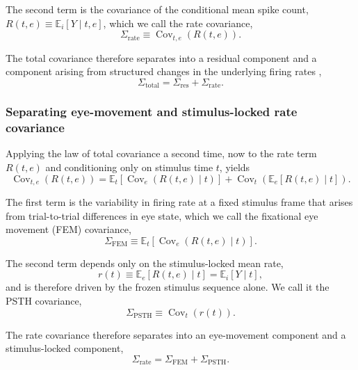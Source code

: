 \documentclass{lite}
\newcommand{\E}{\mathbb{E}}
\renewcommand{\C}{\operatorname{Cov}}
\newcommand{\Crate}{\Sigma_{\text{rate}}}
\begin{document}
The second term is the covariance of the conditional mean spike count, $R(t,e) \equiv \E_{i}[Y \mid t,e]$, which we call the rate covariance,
\begin{equation}
\Crate \equiv \C_{t,e}(R(t,e)).
\end{equation}

The total covariance therefore separates into a residual component and a component arising from structured changes in the underlying firing rates \cite{churchland2011variance},
\begin{equation}
\label{eq:law1}
\Sigma_{\text{total}} = \Sigma_{\text{res}} + \Sigma_{\text{rate}}.
\end{equation}

\subsubsection{Separating eye-movement and stimulus-locked rate covariance}

Applying the law of total covariance a second time, now to the rate term $R(t,e)$ and conditioning only on stimulus time $t$, yields
\begin{equation}
\C_{t,e}(R(t,e))
= \E_{t}\!\left[ \C_{e}(R(t,e) \mid t) \right]
+ \C_{t}\!\left( \E_{e}[R(t,e) \mid t] \right).
\end{equation}

The first term is the variability in firing rate at a fixed stimulus frame that arises from trial-to-trial differences in eye state, which we call the fixational eye movement (FEM) covariance,
\begin{equation}
\Sigma_{\text{FEM}} \equiv \E_{t}\!\left[ \C_{e}(R(t,e) \mid t) \right].
\end{equation}

The second term depends only on the stimulus-locked mean rate,
\begin{equation}
r(t) \equiv \E_{e}[R(t,e) \mid t] = \E_{i}[Y \mid t],
\end{equation}
and is therefore driven by the frozen stimulus sequence alone. We call it the PSTH covariance,
\begin{equation}
\Sigma_{\text{PSTH}} \equiv \C_{t}(r(t)).
\end{equation}

The rate covariance therefore separates into an eye-movement component and a stimulus-locked component,
\begin{equation}
\Sigma_{\text{rate}} = \Sigma_{\text{FEM}} + \Sigma_{\text{PSTH}}.
\end{equation}
\end{document}
